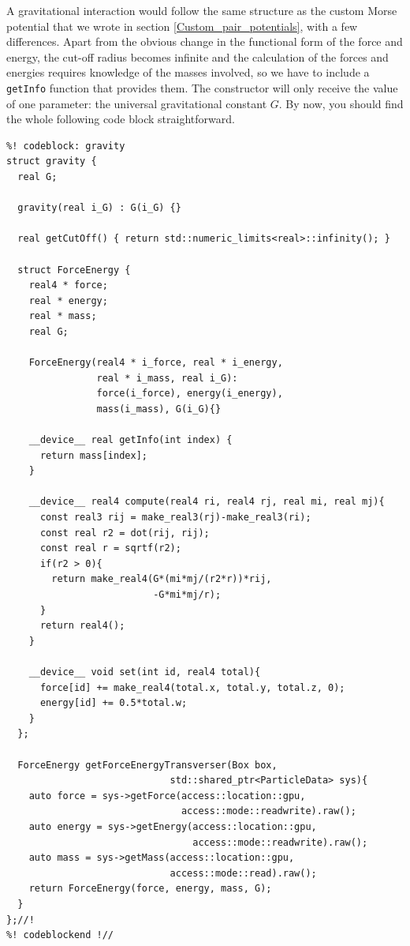 A gravitational interaction would follow the same structure as the custom Morse 
potential that we wrote in section \ref{Custom_pair_potentials}, with a few 
differences. Apart from the obvious change in the functional form of the force 
and energy, the cut-off radius becomes infinite and the calculation of the 
forces and energies requires knowledge of the masses involved, so we have to 
include a \texttt{getInfo} function that provides them. The constructor will 
only receive the value of one parameter: the universal gravitational constant 
$G$. By now, you should find the whole following code block straightforward.
\begin{lstlisting}
%! codeblock: gravity
struct gravity {
  real G;

  gravity(real i_G) : G(i_G) {}

  real getCutOff() { return std::numeric_limits<real>::infinity(); }

  struct ForceEnergy {
    real4 * force;
    real * energy;
    real * mass;
    real G;

    ForceEnergy(real4 * i_force, real * i_energy,
                real * i_mass, real i_G):
                force(i_force), energy(i_energy),
                mass(i_mass), G(i_G){}

    __device__ real getInfo(int index) {
      return mass[index];
    }

    __device__ real4 compute(real4 ri, real4 rj, real mi, real mj){
      const real3 rij = make_real3(rj)-make_real3(ri);
      const real r2 = dot(rij, rij);
      const real r = sqrtf(r2);
      if(r2 > 0){
        return make_real4(G*(mi*mj/(r2*r))*rij,
                          -G*mi*mj/r);
      }
      return real4();
    }

    __device__ void set(int id, real4 total){
      force[id] += make_real4(total.x, total.y, total.z, 0);
      energy[id] += 0.5*total.w;
    }
  };

  ForceEnergy getForceEnergyTransverser(Box box,
                             std::shared_ptr<ParticleData> sys){
    auto force = sys->getForce(access::location::gpu,
                               access::mode::readwrite).raw();
    auto energy = sys->getEnergy(access::location::gpu,
                                 access::mode::readwrite).raw();
    auto mass = sys->getMass(access::location::gpu,
                             access::mode::read).raw();
    return ForceEnergy(force, energy, mass, G);
  }
};//!
%! codeblockend !//
\end{lstlisting}

